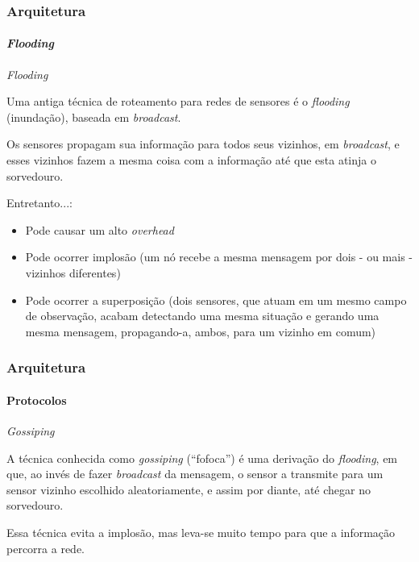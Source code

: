 \documentclass[notes]{beamer}
\begin{document}
\begin{frame}
\label{slide_48}
\frametitle{Arquitetura}
\framesubtitle{\textit{Flooding}}

\begin{block}{\textit{Flooding}}

Uma antiga técnica de roteamento para redes de sensores é o \textit{flooding} (inundação), baseada em \textit{broadcast}. 

\end{block} \pause

\begin{block}

Os sensores propagam sua informação para todos seus vizinhos, em \textit{broadcast}, e esses vizinhos fazem a mesma coisa com a informação até que esta atinja o sorvedouro.

\end{block} \pause

\begin{alertblock}

Entretanto...: \pause

\begin{itemize}

\item Pode causar um alto \textit{overhead} \pause

\item Pode ocorrer implosão (um nó recebe a mesma mensagem por dois - ou mais - vizinhos diferentes) \pause

\item Pode ocorrer a superposição (dois sensores, que atuam em um mesmo campo de observação, acabam detectando uma mesma situação e gerando uma mesma mensagem, propagando-a, ambos, para um vizinho em comum)

\end{itemize}

\end{alertblock}

\end{frame}

\begin{frame}
\label{slide_49}
\frametitle{Arquitetura}
\framesubtitle{Protocolos}

\begin{block}{\textit{Gossiping}}

A técnica conhecida como \textit{gossiping} (“fofoca”) é uma derivação do \textit{flooding}, em que, ao invés de fazer \textit{broadcast} da mensagem, o sensor a transmite para um sensor vizinho escolhido aleatoriamente, e assim por diante, até chegar no sorvedouro.

\end{block} \pause

\begin{alertblock}

Essa técnica evita a implosão, mas leva-se muito tempo para que a informação percorra a rede.  

\end{alertblock}

\end{frame}
\end{document}
